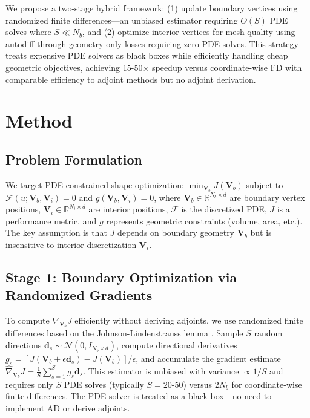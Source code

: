 \documentclass{article}
\begin{document}
We propose a two-stage hybrid framework: (1) update boundary vertices using randomized finite differences—an unbiased estimator requiring $O(S)$ PDE solves where $S \ll N_b$, and (2) optimize interior vertices for mesh quality using autodiff through geometry-only losses requiring zero PDE solves. This strategy treats expensive PDE solvers as black boxes while efficiently handling cheap geometric objectives, achieving 15-50$\times$ speedup versus coordinate-wise FD with comparable efficiency to adjoint methods but no adjoint derivation.

\section{Method}

\subsection{Problem Formulation}

We target PDE-constrained shape optimization: $\min_{\mathbf{V}_b} J(\mathbf{V}_b)$ subject to $\mathcal{F}(u; \mathbf{V}_b, \mathbf{V}_i) = 0$ and $g(\mathbf{V}_b, \mathbf{V}_i) = 0$, where $\mathbf{V}_b \in \mathbb{R}^{N_b \times d}$ are boundary vertex positions, $\mathbf{V}_i \in \mathbb{R}^{N_i \times d}$ are interior positions, $\mathcal{F}$ is the discretized PDE, $J$ is a performance metric, and $g$ represents geometric constraints (volume, area, etc.). The key assumption is that $J$ depends on boundary geometry $\mathbf{V}_b$ but is insensitive to interior discretization $\mathbf{V}_i$.

\subsection{Stage 1: Boundary Optimization via Randomized Gradients}

To compute $\nabla_{\mathbf{V}_b} J$ efficiently without deriving adjoints, we use randomized finite differences based on the Johnson-Lindenstrauss lemma \cite{johnson1984extensions}. Sample $S$ random directions $\mathbf{d}_s \sim \mathcal{N}(0, I_{N_b \times d})$, compute directional derivatives $g_s = [J(\mathbf{V}_b + \epsilon \mathbf{d}_s) - J(\mathbf{V}_b)]/\epsilon$, and accumulate the gradient estimate $\hat{\nabla}_{\mathbf{V}_b} J = \frac{1}{S} \sum_{s=1}^S g_s \mathbf{d}_s$. This estimator is unbiased with variance $\propto 1/S$ and requires only $S$ PDE solves (typically $S = 20$-$50$) versus $2N_b$ for coordinate-wise finite differences. The PDE solver is treated as a black box—no need to implement AD or derive adjoints.
\end{document}
